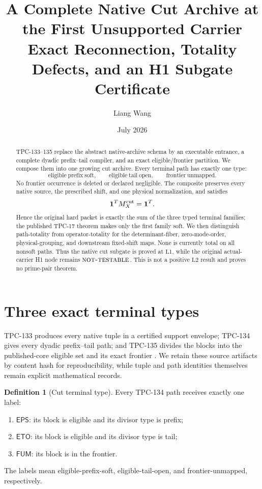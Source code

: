 \documentclass[11pt]{article}
\title{\textbf{A Complete Native Cut Archive at the First Unsupported Carrier}\\
\large Exact Reconnection, Totality Defects, and an H1 Subgate
Certificate}
\author{Liang Wang}
\date{July 2026}
\theoremstyle{definition}
\newtheorem{definition}[theorem]{Definition}
\theoremstyle{remark}
\newcommand{\one}{\mathbf 1}
\newcommand{\Lone}{\mathrm{L1}}
\newcommand{\Ltwo}{\mathrm{L2}}
\newcommand{\NT}{\textsc{not-testable}}
\begin{document}
\maketitle

\begin{abstract}
TPC-133--135 replace the abstract native-archive schema by an
executable entrance, a complete dyadic prefix--tail compiler, and an
exact eligible/frontier partition.  We compose them into one growing
cut archive.  Every terminal path has exactly one type:
\[
 \mathrm{eligible\ prefix\ soft},\qquad
 \mathrm{eligible\ tail\ open},\qquad
 \mathrm{frontier\ unmapped}.
\]
No frontier occurrence is deleted or declared negligible.  The
composite preserves every native source, the prescribed shift, and
one physical normalization, and satisfies
\[
 \one^TM_X^{\rm cut}=\one^T.
\]
Hence the original hard packet is exactly the sum of the three typed
terminal families; the published TPC-17 theorem makes only the first
family soft.  We then distinguish path-totality from operator-totality
for the determinant-fiber, zero-mode-order, physical-grouping, and
downstream fixed-shift maps.  None is currently total on all nonsoft
paths.  Thus the native cut subgate is proved at \(\Lone\), while the
original actual-carrier H1 node remains \(\NT\).  This is not a
positive \(\Ltwo\) result and proves no prime-pair theorem.
\end{abstract}

\section{Three exact terminal types}

TPC-133 produces every native tuple in a certified support envelope;
TPC-134 gives every dyadic prefix--tail path; and TPC-135 divides the
blocks into the published-core eligible set and its exact frontier
\citep{WangTPC133,WangTPC134,WangTPC135}.  We retain these source
artifacts by content hash for reproducibility, while tuple and path
identities themselves remain explicit mathematical records.

\begin{definition}[Cut terminal type]
Every TPC-134 path receives exactly one label:
\begin{enumerate}[label=(\roman*),leftmargin=2.2em]
\item \(\mathsf{EPS}\): its block is eligible and its divisor type is
prefix;
\item \(\mathsf{ETO}\): its block is eligible and its divisor type is
tail;
\item \(\mathsf{FUM}\): its block is in the frontier.
\end{enumerate}
The labels mean eligible-prefix-soft, eligible-tail-open, and
frontier-unmapped, respectively.
\end{definition}
\end{document}
